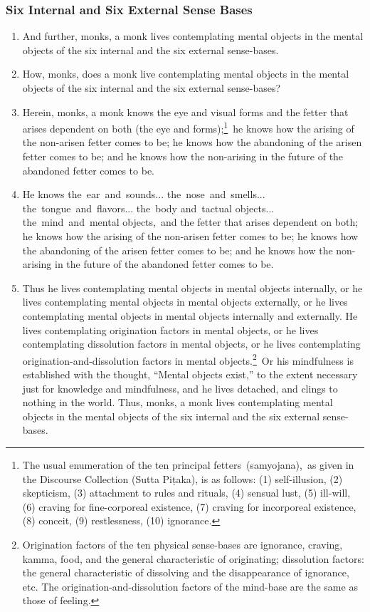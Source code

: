 \subsubsection*{Six Internal and Six External Sense Bases}
\begin{enumerate}[resume]
\item And further, monks, a monk lives contemplating mental objects in the mental objects of the six internal and the six external sense-bases.
\item How, monks, does a monk live contemplating mental objects in the mental objects of the six internal and the six external sense-bases?
\item Herein, monks, a monk knows the eye and visual forms and the fetter that arises dependent on both (the eye and forms);\footnote{The usual enumeration of the ten principal fetters (samyojana), as given in the Discourse Collection (Sutta Piṭaka), is as follows: (1) self-illusion, (2) skepticism, (3) attachment to rules and rituals, (4) sensual lust, (5) ill-will, (6) craving for fine-corporeal existence, (7) craving for incorporeal existence, (8) conceit, (9) restlessness, (10) ignorance.} he knows how the arising of the non-arisen fetter comes to be; he knows how the abandoning of the arisen fetter comes to be; and he knows how the non-arising in the future of the abandoned fetter comes to be.
\item He knows the ear and sounds... the nose and smells... the tongue and flavors... the body and tactual objects... the mind and mental objects, and the fetter that arises dependent on both; he knows how the arising of the non-arisen fetter comes to be; he knows how the abandoning of the arisen fetter comes to be; and he knows how the non-arising in the future of the abandoned fetter comes to be.
\pagebreak
\item Thus he lives contemplating mental objects in mental objects internally, or he lives contemplating mental objects in mental objects externally, or he lives contemplating mental objects in mental objects internally and externally. He lives contemplating origination factors in mental objects, or he lives contemplating dissolution factors in mental objects, or he lives contemplating origination-and-dissolution factors in mental objects.\footnote{Origination factors of the ten physical sense-bases are ignorance, craving, kamma, food, and the general characteristic of originating; dissolution factors: the general characteristic of dissolving and the disappearance of ignorance, etc. The origination-and-dissolution factors of the mind-base are the same as those of feeling.} Or his mindfulness is established with the thought, “Mental objects exist,” to the extent necessary just for knowledge and mindfulness, and he lives detached, and clings to nothing in the world. Thus, monks, a monk lives contemplating mental objects in the mental objects of the six internal and the six external sense-bases.
\end{enumerate}
